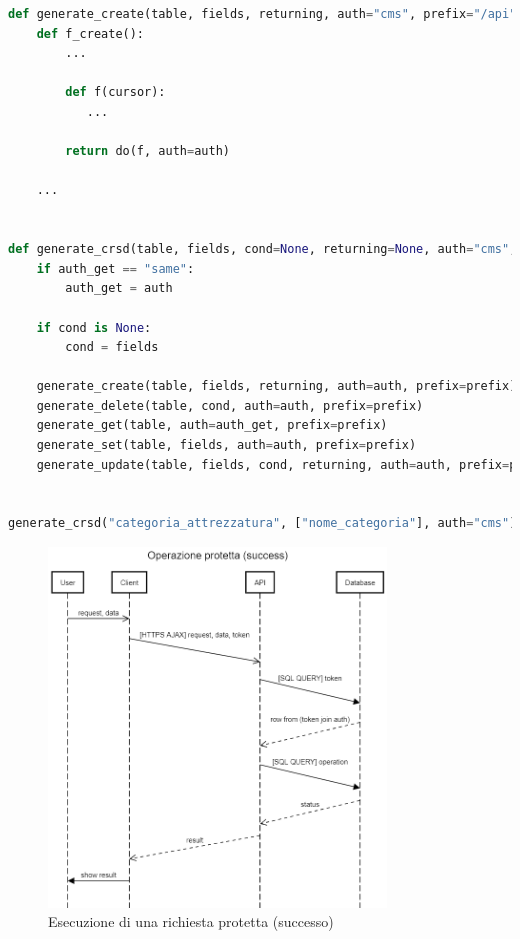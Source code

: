 \documentclass[11pt,a4paper,english]{article}
\begin{document}
\begin{lstlisting}[language=Python, caption=Esempio di funzione generatrice di endpoint modificata e relativa chiamata]
def generate_create(table, fields, returning, auth="cms", prefix="/api"):
    def f_create():
        ...

        def f(cursor):
           ...

        return do(f, auth=auth)

    ...
    
    
def generate_crsd(table, fields, cond=None, returning=None, auth="cms", auth_get="login", prefix="/api"):
    if auth_get == "same":
        auth_get = auth

    if cond is None:
        cond = fields

    generate_create(table, fields, returning, auth=auth, prefix=prefix)
    generate_delete(table, cond, auth=auth, prefix=prefix)
    generate_get(table, auth=auth_get, prefix=prefix)
    generate_set(table, fields, auth=auth, prefix=prefix)
    generate_update(table, fields, cond, returning, auth=auth, prefix=prefix)
    
    
generate_crsd("categoria_attrezzatura", ["nome_categoria"], auth="cms")
\end{lstlisting}

\begin{figure}[H]
    \centering
    \includegraphics[width=0.8\textwidth]{img/Operazione protetta (success).png}
    \caption{Esecuzione di una richiesta protetta (successo)}
\end{figure}
\end{document}
